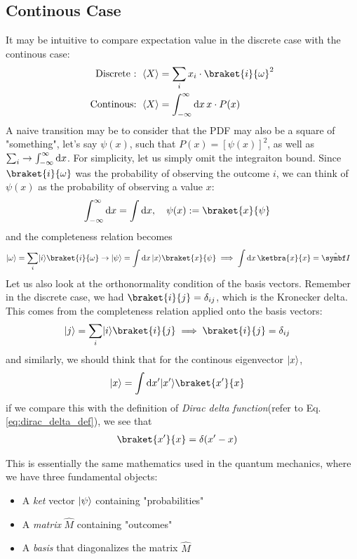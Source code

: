 \subsection{Continous Case}
It may be intuitive to compare expectation value in the discrete case with the continous case:
\begin{align}
  \text{Discrete : } \expect{X} & = \sum_i x_i \cdot \braket{i}{\omega}^2            \\
  \text{Continous: } \expect{X} & = \int_{-\infty}^{\infty} \odif{x} \, x \cdot P(x)
\end{align}
A naive transition may be to consider that the PDF may also be a square of "something", let's say $\psi(x)$, such that $P(x) = [\psi(x)]^2$, as well as $\sum_i \to \int_{-\infty}^{\infty} \odif{x}$.
For simplicity, let us simply omit the integraiton bound.
Since $\braket{i}{\omega}$ was the probability of observing the outcome $i$, we can think of $\psi(x)$ as the probability of observing a value $x$:
\begin{align}
  \int_{-\infty}^{\infty} \odif{x} = \int \odif{x}, \quad \psi(x) & := \braket{x}{\psi}
\end{align}
and the completeness relation becomes
\begin{align}
  \ket{\omega} & = \sum_i \ket{i} \braket{i}{\omega} \to \ket{\psi} =  \int \odif{x} \, \ket{x} \braket{x}{\psi} \implies \int \odif{x} \, \ketbra{x}{x} = \idty
\end{align}
Let us also look at the orthonormality condition of the basis vectors.
Remember in the discrete case, we had $\braket{i}{j} = \delta_{ij}$, which is the Kronecker delta.
This comes from the completeness relation applied onto the basis vectors:
\begin{align}
  \ket{j} & = \sum_i \ket{i} \braket{i}{j} \implies \braket{i}{j} = \delta_{ij}
\end{align}
and similarly, we should think that for the continous eigenvector $\lvert x\rangle$,
\begin{align}
  \ket{x} & = \int \odif{x^{\prime}} \ket{x^{\prime}} \braket{x^{\prime}}{x}
\end{align}
if we compare this with the definition of \emph{Dirac delta function}(refer to Eq. \eqref{eq:dirac_delta_def}), we see that
\begin{align}
  \braket{x^\prime}{x} & = \delta(x^\prime - x)
\end{align}

This is essentially the same mathematics used in the quantum mechanics, where we have three fundamental objects:
\begin{itemize}
  \item A \emph{ket} vector $\lvert\psi\rangle$ containing "probabilities"
  \item A \emph{matrix} $\hat{M}$ containing "outcomes"
  \item A \emph{basis} that diagonalizes the matrix $\hat{M}$
\end{itemize}

